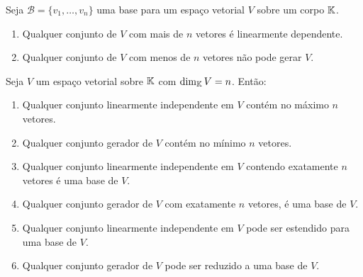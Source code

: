 \begin{teorema}
  Seja $\mathcal{B} = \{v_1, \dots, v_n\}$ uma base para um espaço vetorial $V$ sobre um corpo $\mathbb{K}$.
  \begin{enumerate}[label={\roman*})]
    \item Qualquer conjunto de $V$ com mais de $n$ vetores é linearmente dependente.

    \item Qualquer conjunto de $V$ com menos de $n$ vetores não pode gerar $V$.
  \end{enumerate}
\end{teorema}

\begin{teorema}\label{ResumoLDLI}
  Seja $V$ um espaço vetorial sobre $\mathbb{K}$ com $\dim_{\mathbb{K}} V = n$. Então:
  \begin{enumerate}[label={\roman*})]
    \item\label{maximoLI} Qualquer conjunto linearmente independente em $V$ contém no máximo $n$ vetores.

    \item\label{minimogerador} Qualquer conjunto gerador de $V$ contém no mínimo $n$ vetores.

    \item\label{LIbase} Qualquer conjunto linearmente independente em $V$ contendo exatamente $n$ vetores é uma base de $V$.

    \item\label{geraBase} Qualquer conjunto gerador de $V$ com exatamente $n$ vetores, é uma base de $V$.

    \item Qualquer conjunto linearmente independente em $V$ pode ser estendido para uma base de $V$.

    \item Qualquer conjunto gerador de $V$ pode ser reduzido a uma base de $V$.
  \end{enumerate}
\end{teorema}


